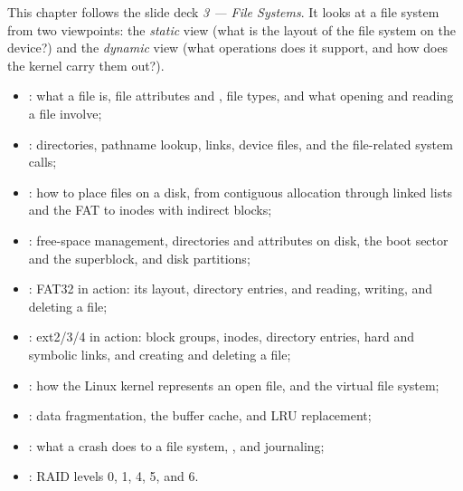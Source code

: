 This chapter follows the slide deck \emph{3 --- File Systems}. It looks at a file system from two viewpoints: the \emph{static} view (what is the layout of the file system on the device?) and the \emph{dynamic} view (what operations does it support, and how does the kernel carry them out?).
\begin{itemize}
  \item {}: what a file is, file attributes and , file types, and what opening and reading a file involve;
  \item {}: directories, pathname lookup, links, device files, and the file-related system calls;
  \item {}: how to place files on a disk, from contiguous allocation through linked lists and the FAT to inodes with indirect blocks;
  \item {}: free-space management, directories and attributes on disk, the boot sector and the superblock, and disk partitions;
  \item {}: FAT32 in action: its layout, directory entries, and reading, writing, and deleting a file;
  \item {}: ext2/3/4 in action: block groups, inodes, directory entries, hard and symbolic links, and creating and deleting a file;
  \item {}: how the Linux kernel represents an open file, and the virtual file system;
  \item {}: data fragmentation, the buffer cache, and LRU replacement;
  \item {}: what a crash does to a file system, , and journaling;
  \item {}: RAID levels 0, 1, 4, 5, and 6.
\end{itemize}












